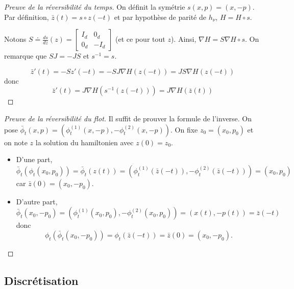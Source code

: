 \documentclass[10pt]{beamer}
\begin{document}
\begin{frame}
	\begin{proof}[Preuve de la réversibilité du temps]
		On définit la symétrie $s(x,p) = (x,-p)$. Par définition, $\bar{z}(t) = s \circ z (-t)$ et par hypothèse de parité de $h_\nu$, $H = H \circ s$.

		Notons $S \doteq \frac{ds}{dz}(z) = \begin{bmatrix} I_d & 0_d \\ 0_d & -I_d \end{bmatrix}$ (et ce pour tout $z$). Ainsi, $\nabla H = S \nabla H \circ s$. On remarque que $SJ = -JS$ et $s^{-1} = s$.

		$$\bar z'(t) = -Sz'(-t) = -SJ\nabla H(z(-t)) = JS \nabla H(z(-t))$$
		donc
		$$\bar z'(t) = J \nabla H (s^{-1}(z(-t))) = J \nabla H(\bar z(t))$$
	\end{proof}
\end{frame}

\begin{frame}
	\begin{proof}[Preuve de la réversibilité du flot]
		Il suffit de prouver la formule de l'inverse. On pose $\bar \phi_t(x,p) = (\phi_t^{(1)}(x, -p), - \phi_t^{(2)}(x, -p))$. On fixe $z_0 = (x_0,p_0)$ et on note $z$ la solution du hamiltonien avec $z(0) = z_0$.
		\begin{itemize}
			\item D'une part,
			$$
			\bar \phi_t(\phi_t(x_0,p_0)) = \bar \phi_t(z(t)) = (\phi_t^{(1)}(\bar z(-t)), - \phi_t^{(2)}(\bar z(-t))) = (x_0, p_0)
			$$
			car $\bar z(0) = (x_0,-p_0)$.

			\item D'autre part,
			$$
			\bar \phi_t(x_0,-p_0) = (\phi_t^{(1)}(x_0, p_0), - \phi_t^{(2)}(x_0, p_0)) = (x(t),-p(t)) = \bar z(-t)
			$$
			donc
			$$
			\phi_t (\bar \phi_t(x_0,-p_0)) = \phi_t(\bar z(-t)) = \bar{z}(0) = (x_0,-p_0).
			$$
		\end{itemize}
	\end{proof}
\end{frame}
 
\subsection{Discrétisation}
\end{document}
